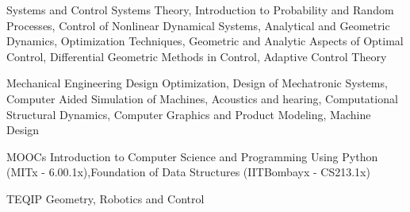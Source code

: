 

\begin{cvskills}
	\cvskill
		{Systems and Control}
		{Systems Theory, Introduction to Probability and Random Processes, Control of Nonlinear Dynamical Systems, Analytical and Geometric Dynamics, Optimization Techniques, Geometric and Analytic Aspects of Optimal Control, Differential Geometric Methods in Control, Adaptive Control Theory}

	\cvskill
		{Mechanical Engineering}
		{Design Optimization, Design of Mechatronic Systems, Computer Aided Simulation of Machines, Acoustics and hearing, Computational Structural Dynamics, Computer Graphics and Product Modeling, Machine Design}

	\cvskill
		{MOOCs}
		{Introduction to Computer Science and Programming Using Python (MITx - 6.00.1x),\newline Foundation of Data Structures (IITBombayx - CS213.1x)}

	\cvskill
		{TEQIP}
		{Geometry, Robotics and Control}
\end{cvskills}